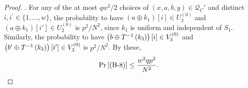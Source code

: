 \begin{proof}

\noindent \textsc{\beight}. For any of the at most $qw^2/2$ choices of $(x,a,b,y)\in\mathcal{Q}_C'$ and distinct $i, i^{\prime}\in\{1, \ldots, w\}$, the probability to have $(a \oplus k_1)[i]\in U_{2}^{(0)}$ and $(a \oplus k_1)[i']\in U_{2}^{(0)}$ is $p^2/N^2$, since $k_1$ is uniform and independent of $S_1$. Similarly, the probability to have $\left(b\oplus T^{-1}\left(k_3\right)\right)[i]\in V_3^{(0)}$ and
$\left(b'\oplus T^{-1}\left(k_3\right)\right)[i']\in V_3^{(0)}$ is $p^2/N^2$. By these,
%
$$
\operatorname{Pr}\left[\text{(B-8)}\right] \leq \frac{w^2qp^2}{N^2}.
$$


%
%
%
%
%







%
%






\end{proof}
